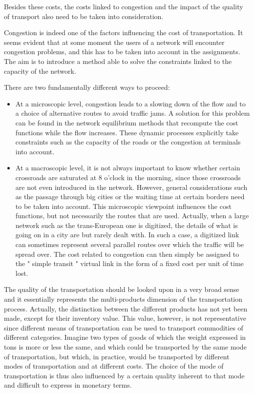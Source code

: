Besides these costs, the costs linked to congestion and the impact of the
quality of transport also need to be taken into consideration.

Congestion is indeed one of the factors influencing the cost of transportation.
It seems evident that at some moment the users of a network will encounter
congestion problems, and this has to be taken into account in the assignments.
The aim is to introduce a method able to solve the constraints linked to the
capacity of the network.

There are two fundamentally different ways to proceed:


\begin{itemize}

\item At a microscopic level, congestion leads to a slowing down of the flow and to a
choice of alternative routes to avoid traffic jams.  A solution for this
problem can be found in the network equilibrium methods that recompute the
cost functions while the flow increases.  These dynamic processes explicitly take
constraints such as the capacity of the roads or the congestion at terminals
into account.

\item At a macroscopic level, it is not always important to know whether certain
crossroads are saturated at 8 o'clock in the morning, since those crossroads are
not even introduced in the network.  However, general considerations such as the
passage through big cities or the waiting time at certain borders need to be
taken into account.  This microscopic viewpoint influences the cost functions, but
not necessarily the routes that are used.  Actually, when a large network such
as the trans-European one is digitized, the details of what is going on in a city are but rarely
dealt with.  In such a case, a digitized link can sometimes represent several
parallel routes over which the traffic will be spread over.  The cost
related to congestion can then simply be assigned to the " simple transit " virtual link in the form of a fixed cost per unit of time lost.

\end{itemize}


The quality of the transportation should be looked upon in a very broad sense
and it essentially represents the multi-products dimension of the transportation
process.  Actually, the distinction between the different products has not yet
been made, except for their inventory value.  This value, however, is not
representative since different means of transportation can be used to transport
commodities of different categories.  Imagine two types of goods of which the
weight expressed in tons is more or less the same, and which could be
transported by the same mode of transportation, but which, in practice, would be
transported by different modes of transportation and at different costs.  The
choice of the mode of transportation is thus also influenced by a certain
quality inherent to that mode and difficult to express in monetary terms.

